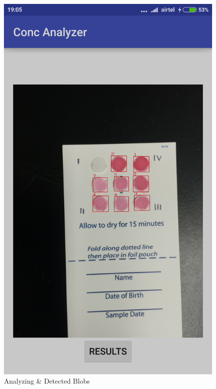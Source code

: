 \documentclass[runningheads,a4paper]{llncs}
\begin{document}
\begin{figure}[h!]
\begin{center}
\includegraphics[scale=0.12]{conc4}
\caption{Analyzing \& Detected Blobs}
\label{fig:scr2}
\end{center}
\end{figure}
\end{document}
